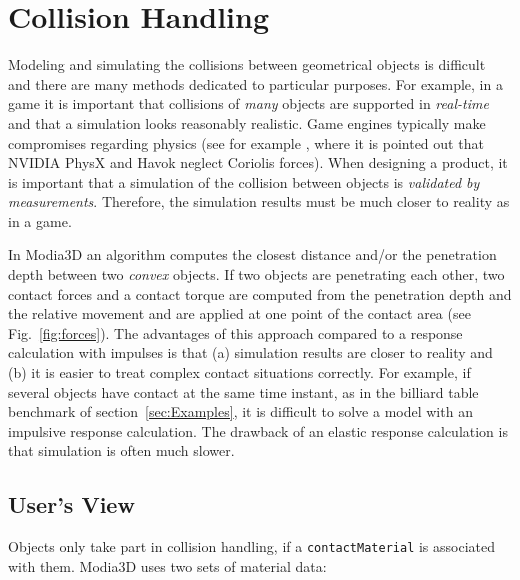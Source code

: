 
\section{Collision Handling}\label{sec:collHandling}

Modeling and simulating the collisions between geometrical objects is difficult and there are many
methods dedicated to particular purposes. For example, in a game it is important that  
collisions of \emph{many} objects are supported in \emph{real-time} and that a simulation looks 
reasonably realistic. Game engines typically make compromises regarding physics (see for
example \cite{Erez2015}, where it is pointed out that NVIDIA PhysX and Havok neglect
Coriolis forces).
When designing a product, it is important that a simulation of the collision between objects
is \emph{validated by measurements}. Therefore, the simulation results must
be much closer to reality as in a game.

In Modia3D an algorithm computes the closest distance and/or the penetration depth
between two \emph{convex} objects.
If two objects are penetrating each other, two contact forces and 
a contact torque are computed from the penetration depth and the relative movement
and are applied at one point of the contact area (see Fig.~\ref{fig:forces}).
The advantages of this approach compared to a response calculation with impulses
is that (a) simulation results are closer
to reality and (b) it is easier to treat complex contact situations correctly. For example, if several objects have contact at the same time instant, as in the billiard table benchmark of section~\ref{sec:Examples}, 
it is difficult to solve a model with an impulsive response calculation. The drawback of an elastic
response calculation is that simulation is often much slower.


\subsection{User's View}

Objects only take part in collision handling, if a \texttt{contactMaterial} is
associated with them. Modia3D uses two sets of material data:

